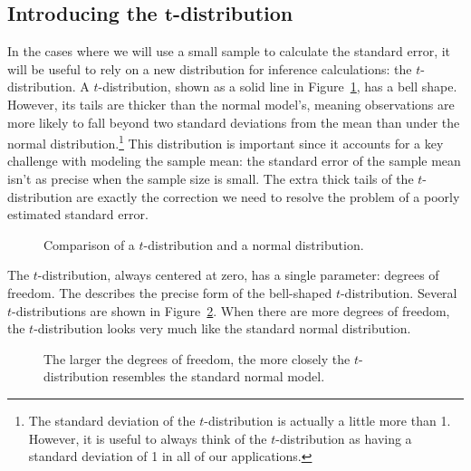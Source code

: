 \subsection{Introducing the $\mathbf{t}$-distribution}
\label{introducingTheTDistribution}


In the cases where we will use a small sample to calculate
the standard error, it will be useful to rely on a new distribution
for inference calculations: the $t$-distribution.
A $t$-distribution, shown as a solid line in
Figure~\ref{tDistCompareToNormalDist}, has a bell shape.
However, its tails are thicker than the normal model's,
meaning observations are more likely to fall beyond two
standard deviations from the mean than under the normal
distribution.\footnote{The standard deviation of the
  $t$-distribution is actually a little more than 1.
  However, it is useful to always think of the $t$-distribution
  as having a standard deviation of 1 in all of our applications.}
This distribution is important since it accounts for
a key challenge with modeling the sample mean:
the standard error of the sample mean isn't as
precise when the sample size is small.
The extra thick tails of the $t$-distribution are exactly
the correction we need to resolve the problem of a poorly
estimated standard error.

\begin{figure}[h]
  \centering
  \caption{Comparison of a $t$-distribution
      and a normal distribution.}
  \label{tDistCompareToNormalDist}
\end{figure}

The $t$-distribution, always centered at zero,
has a single parameter: degrees of freedom.
The 
describes the precise form of the bell-shaped $t$-distribution.
Several $t$-distributions are shown in
Figure~\ref{tDistConvergeToNormalDist}.
When there are more degrees of freedom, the $t$-distribution
looks very much like the standard normal distribution.

\begin{figure}
  \centering
  \caption{The larger the degrees of freedom, the more
      closely the $t$-distribution resembles the standard
      normal model.}
  \label{tDistConvergeToNormalDist}
\end{figure}


